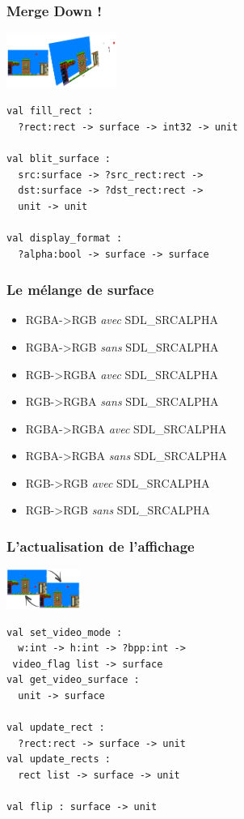 \begin{frame}[fragile]
	\frametitle{\og{}Merge Down !\fg}
	\begin{center}
		\includegraphics[width=3.6cm]{pics/surfacesMerge.png}
	\end{center}
	\begin{lstlisting}
val fill_rect : 
  ?rect:rect -> surface -> int32 -> unit

val blit_surface : 
  src:surface -> ?src_rect:rect -> 
  dst:surface -> ?dst_rect:rect -> 
  unit -> unit

val display_format : 
  ?alpha:bool -> surface -> surface
	\end{lstlisting}
\end{frame}

\begin{frame}[fragile]
	\frametitle{Le mélange de surface}
	\scriptsize
	\begin{itemize}
		\item RGBA->RGB \textit{avec} SDL\_SRCALPHA 
		\item RGBA->RGB \textit{sans} SDL\_SRCALPHA
	\end{itemize}
	\begin{itemize}
		\item RGB->RGBA \textit{avec} SDL\_SRCALPHA
		\item RGB->RGBA \textit{sans} SDL\_SRCALPHA
	\end{itemize}
	\begin{itemize}
		\item RGBA->RGBA \textit{avec} SDL\_SRCALPHA
		\item RGBA->RGBA \textit{sans} SDL\_SRCALPHA
	\end{itemize}
	\begin{itemize}
		\item RGB->RGB \textit{avec} SDL\_SRCALPHA	
		\item RGB->RGB \textit{sans} SDL\_SRCALPHA
	\end{itemize}
\end{frame}

\begin{frame}[fragile]
	\frametitle{L'actualisation de l'affichage}
	\begin{center}
		\includegraphics[width=2.4cm]{pics/doubleBufferScreen.png}
	\end{center}
	\begin{lstlisting}
val set_video_mode : 
  w:int -> h:int -> ?bpp:int -> 
 video_flag list -> surface
val get_video_surface : 
  unit -> surface

val update_rect : 
  ?rect:rect -> surface -> unit
val update_rects : 
  rect list -> surface -> unit

val flip : surface -> unit
	\end{lstlisting}
\end{frame}


